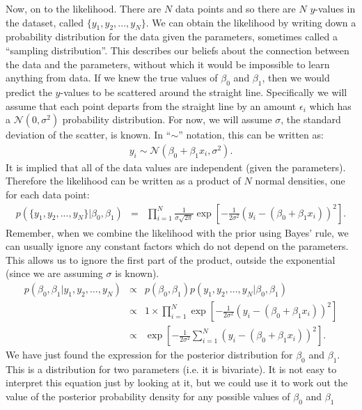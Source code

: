 Now, on to the likelihood. There are $N$ data points and so there are $N$
$y$-values in the dataset, called $\{y_1, y_2, ..., y_N\}$. We can obtain the
likelihood by writing down a probability distribution for the data given the
parameters, sometimes called a ``sampling distribution''. This describes our
beliefs about the connection between the data and the parameters, without which
it would be impossible to learn anything from data.
If we
knew the true values of $\beta_0$ and $\beta_1$, then we would predict the
$y$-values to be scattered around the straight line. Specifically we
will assume that each point departs from the straight line by an amount
$\epsilon_i$ which has a $\mathcal{N}(0, \sigma^2)$ probability distribution.
For now, we will assume $\sigma$, the standard deviation of the scatter, is known.
In ``$\sim$'' notation, this can be written as:
\begin{eqnarray}
y_i \sim \mathcal{N}(\beta_0 + \beta_1 x_i, \sigma^2).
\end{eqnarray}
It is implied that all of the data values are independent (given the
parameters). Therefore the likelihood can be written as a product of $N$
normal densities, one for each data point:
\begin{eqnarray}
p(\{y_1, y_2, ..., y_N\}|\beta_0, \beta_1) &=& \prod_{i=1}^N \frac{1}{\sigma\sqrt{2\pi}}
\exp\left[-\frac{1}{2\sigma^2}\left(y_i - (\beta_0 + \beta_1 x_i)\right)^2\right].
\end{eqnarray}
Remember, when we combine the likelihood with the prior using Bayes' rule,
we can usually ignore any constant factors which do not depend on
the parameters. This allows us to ignore the first part of the product, outside
the exponential (since we are assuming $\sigma$ is known).
\begin{eqnarray}
p(\beta_0, \beta_1 | y_1, y_2, ..., y_N) &\propto& p(\beta_0, \beta_1)
p(y_1, y_2, ..., y_N|\beta_0, \beta_1)\\
&\propto& 1 \times \prod_{i=1}^N \exp\left[-\frac{1}{2\sigma^2}\left(y_i - (\beta_0 + \beta_1 x_i)\right)^2\right]\\
&\propto& \exp\left[-\frac{1}{2\sigma^2}\sum_{i=1}^N\left(y_i - (\beta_0 + \beta_1 x_i)\right)^2\right].
\label{eq:leastsquares}
\end{eqnarray}
We have just found the expression for the posterior distribution for $\beta_0$
and $\beta_1$. This is a distribution for two parameters (i.e. it is bivariate).
It is not easy to interpret this equation just by
looking at it, but we could use it to work out the value of the posterior
probability density for any possible values of $\beta_0$ and $\beta_1$

